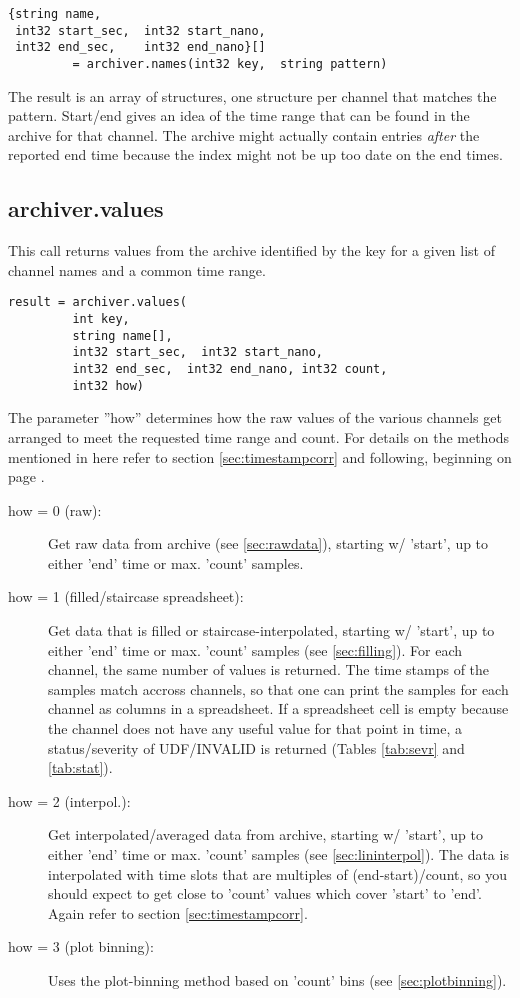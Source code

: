 \begin{lstlisting}[keywordstyle=\sffamily]
{string name, 
 int32 start_sec,  int32 start_nano,
 int32 end_sec,    int32 end_nano}[] 
         = archiver.names(int32 key,  string pattern)
\end{lstlisting}

\noindent The result is an array of structures,  one structure
per channel that matches the pattern.
Start/end gives an idea of the time range that can
be found in the archive for that channel.
The archive might actually contain entries \emph{after}
the reported end time because the index might not
be up too date on the end times.

\subsection{archiver.values} \label{sec:archiver:values} %
This call returns values from the archive identified by the key for a
given list of channel names and a common time range.

\begin{lstlisting}[keywordstyle=\sffamily]
result = archiver.values(
         int key, 
         string name[], 
         int32 start_sec,  int32 start_nano,
         int32 end_sec,  int32 end_nano, int32 count,
         int32 how)
\end{lstlisting}

\noindent The parameter ''how'' determines how the raw values of the
various channels get arranged to meet the requested time range and
count.  For details on the methods mentioned in here refer to section
\ref{sec:timestampcorr} and following, beginning on page
\pageref{sec:timestampcorr}.
\begin{description}
\item[\sffamily how = 0 (raw):]
  Get raw data from archive (see \ref{sec:rawdata}), starting w/ 'start',
  up to either 'end' time or max. 'count' samples.
\item[\sffamily how = 1 (filled/staircase spreadsheet):]
  Get data that is filled or staircase-interpolated, starting
  w/ 'start', up to either 'end' time or max. 'count' samples
  (see \ref{sec:filling}).
  For each channel, the same number of values is returned. The
  time stamps of the samples match accross channels, so that one can
  print the samples for each channel as columns in a spreadsheet.
  If a spreadsheet cell is empty because the channel does not have any
  useful value for that point in time, a status/severity of
  UDF/INVALID is returned (Tables \ref{tab:sevr} and \ref{tab:stat}).
\item[\sffamily how = 2 (interpol.):]
  Get interpolated/averaged data from archive, starting w/ 'start',
  up to either 'end' time or max. 'count' samples
  (see \ref{sec:lininterpol}).
  The data is interpolated with time slots that are multiples
  of (end-start)/count, so you should expect to get close to 'count'
  values which cover 'start' to 'end'.
  Again refer to section \ref{sec:timestampcorr}.
\item[\sffamily how = 3 (plot binning):]
  Uses the plot-binning method based on 'count' bins
  (see \ref{sec:plotbinning}).
\end{description}

